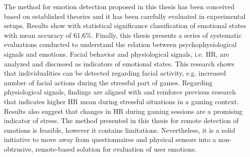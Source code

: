The method for emotion detection proposed in this thesis has been conceived based on established theories and it has been carefully evaluated in experimental setups. Results show with statistical significance classification of emotional states with mean accuracy of 61.6\%. Finally, this thesis presents a series of systematic evaluations conducted to understand the relation between psychophysiological signals and emotions. Facial behavior and physiological signals, i.e. HR, are analyzed and discussed as indicators of emotional states. This research shows that individualities can be detected regarding facial activity, e.g. increased number of facial actions during the stressful part of games. Regarding physiological signals, findings are aligned with and reinforce previous research that indicates higher HR mean during stressful situations in a gaming context. Results also suggest that changes in HR during gaming sessions are a promising indicator of stress. The method presented in this thesis for remote detection of emotions is feasible, however it contains limitations. Nevertheless, it is a solid initiative to move away from questionnaires and physical sensors into a non-obtrusive, remote-based solution for evaluation of user emotions.
